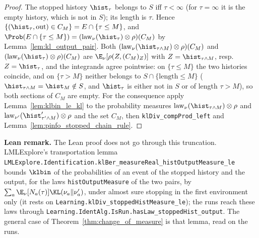 \begin{proof}
\leanok
The stopped history $\hist_\tau$ belongs to $S$ iff $\tau < \infty$ (for $\tau = \infty$ it is
the empty history, which is not in $S$); its length is $\tau$. Hence
$\{(\hist_\tau, \mathrm{out}) \in C_M\} = E \cap \{\tau \le M\}$, and
$\Prob(E \cap \{\tau \le M\}) = (\mathrm{law}_\nu(\hist_\tau)\otimes\rho)(C_M)$ by
Lemma~\ref{lem:kl_output_pair}. Both $(\mathrm{law}_\nu(\hist_{\tau\wedge M})\otimes\rho)(C_M)$ and
$(\mathrm{law}_\nu(\hist_\tau)\otimes\rho)(C_M)$ are
$\E_\nu[\rho(Z, (C_M)_Z)]$ with $Z = \hist_{\tau\wedge M}$, resp.\ $Z = \hist_\tau$, and the
integrands agree pointwise: on $\{\tau \le M\}$ the two histories coincide, and on
$\{\tau > M\}$ neither belongs to $S \cap \{\mathrm{length} \le M\}$
($\hist_{\tau\wedge M} = \hist_M \notin S$, and $\hist_\tau$ is either not in $S$ or of length
$\tau > M$), so both sections of $C_M$ are empty. For the consequence apply
Lemma~\ref{lem:klbin_le_kl} to the probability measures
$\mathrm{law}_\nu(\hist_{\tau\wedge M})\otimes\rho$ and
$\mathrm{law}_{\nu'}(\hist'_{\tau'\wedge M})\otimes\rho$ and the set $C_M$, then
\texttt{klDiv\_compProd\_left} and Lemma~\ref{lem:pinfo_stopped_chain_rule}.
\end{proof}

\textbf{Lean remark.} The Lean proof does not go through this truncation. LMLExplore's
transportation lemma \texttt{LMLExplore.Identification.klBer\_measureReal\_histOutputMeasure\_le}
bounds $\klbin$ of the probabilities of an event of the stopped history and the output, for the
laws \texttt{histOutputMeasure} of the two pairs, by $\sum_a \E_\nu[N_a(\tau)]\KL(\nu_a\|\nu'_a)$,
under almost sure stopping in the first environment only (it rests on
\texttt{Learning.klDiv\_stoppedHistMeasure\_le}); the runs reach these laws through
\texttt{Learning.IdentAlg.IsRun.hasLaw\_stoppedHist\_output}. The general case of
Theorem~\ref{thm:change_of_measure} is that lemma, read on the runs.

